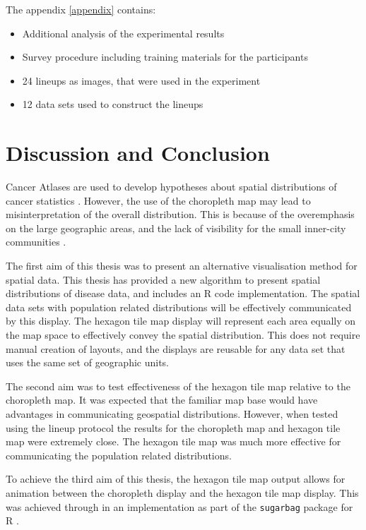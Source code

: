 \documentclass{monashthesis}
\begin{document}
The appendix \ref{appendix} contains:

\begin{itemize}
\tightlist
\item
  Additional analysis of the experimental results
\item
  Survey procedure including training materials for the participants
\item
  24 lineups as images, that were used in the experiment
\item
  12 data sets used to construct the lineups
\end{itemize}

\hypertarget{conclusion}{%
\chapter{Discussion and Conclusion}\label{conclusion}}

Cancer Atlases are used to develop hypotheses about spatial distributions of cancer statistics \autocite{CPISACA}. However, the use of the choropleth map may lead to misinterpretation of the overall distribution. This is because of the overemphasis on the large geographic areas, and the lack of visibility for the small inner-city communities \autocite{ACTUC}.

The first aim of this thesis was to present an alternative visualisation method for spatial data. This thesis has provided a new algorithm to present spatial distributions of disease data, and includes an R code \autocite{R} implementation. The spatial data sets with population related distributions will be effectively communicated by this display. The hexagon tile map display will represent each area equally on the map space to effectively convey the spatial distribution. This does not require manual creation of layouts, and the displays are reusable for any data set that uses the same set of geographic units.

The second aim was to test effectiveness of the hexagon tile map relative to the choropleth map. It was expected that the familiar map base would have advantages in communicating geospatial distributions. However, when tested using the lineup protocol the results for the choropleth map and hexagon tile map were extremely close. The hexagon tile map was much more effective for communicating the population related distributions.

To achieve the third aim of this thesis, the hexagon tile map output allows for animation between the choropleth display and the hexagon tile map display. This was achieved through in an implementation as part of the \texttt{sugarbag} \autocite{sugarbag} package for R \autocite{R}.
\end{document}
